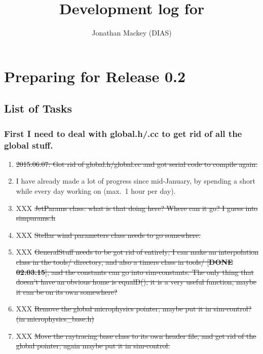 \documentclass[a4paper,11pt]{article}
\title{Development log for \pion{}}
\author{Jonathan Mackey (DIAS)}
\begin{document}
\maketitle


\section{Preparing for Release 0.2}

\subsection{List of Tasks}

\subsubsection{First I need to deal with global.h/.cc to get rid of all the global stuff.}
\begin{enumerate}
\item \sout{2015.06.07: Got rid of global.h/global.cc and got serial code to compile again.}
\item I have already made a lot of progress since mid-January, by spending a short while every day working on \pion{} (max.~1 hour per day).
\item XXX \sout{JetParams class: what is that doing here?  Where can it go?  I guess into simparams.h}
\item XXX \sout{Stellar wind parameters class needs to go somewhere.}
\item XXX \sout{GeneralStuff needs to be got rid of entirely; I can make an interpolation class in the tools/ directory, and also a timers class in tools/ [\textbf{DONE 02.03.15}], and the constants can go into sim-constants.
  The only thing that doesn't have an obvious home is equalD(); it is a very useful function, maybe it can be on its own somewhere?}
\item XXX \sout{Remove the global microphysics pointer; maybe put it in sim-control? (in microphysics\_base.h)}
\item XXX \sout{Move the raytracing base class to its own header file, and get rid of the global pointer; again maybe put it in sim-control.}
\end{enumerate}
\end{document}
